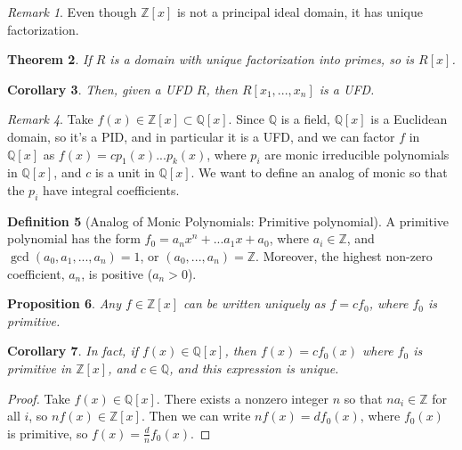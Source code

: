 \documentclass[12pt]{article}
\newtheorem{thm}{Theorem}[section]
\newtheorem{cor}[thm]{Corollary}
\newtheorem{prop}[thm]{Proposition}
\theoremstyle{definition}
\newtheorem{defn}[thm]{Definition}
\theoremstyle{remark}
\newtheorem{rmk}[thm]{Remark}
\numberwithin{equation}{section}
\newcommand\Z{\mathbb Z}    %
\newcommand\Q{\mathbb Q}    %
\begin{document}
\begin{rmk}
        Even though $\Z[x]$ is not a principal ideal domain, it has unique factorization.
\end{rmk}

\vspace{15pt}

\begin{thm}
        If $R$ is a domain with unique factorization into primes, so is $R[x]$.
\end{thm}

\vspace{15pt}

\begin{cor}
        Then, given a UFD $R$, then $R[x_1,...,x_n]$ is a UFD.
\end{cor}

\vspace{15pt}

\begin{rmk}
        Take $f(x) \in \Z[x] \subset \Q[x]$. Since $\Q$ is a field, $\Q[x]$ is a Euclidean domain, so it's a PID, and in particular it is a UFD, and we can factor $f$ in $\Q[x]$ as $f(x) = cp_1(x)...p_k(x)$, where $p_i$ are monic irreducible polynomials in $\Q[x]$, and $c$ is a unit in $\Q[x]$. We want to define an analog of monic so that the $p_i$ have integral coefficients.
\end{rmk}

\vspace{15pt}

\begin{defn}[Analog of Monic Polynomials: Primitive polynomial]
        A primitive polynomial has the form $f_0 = a_nx^n + ... a_1x + a_0$, where $a_i \in \Z$, and $\gcd(a_0,a_1,...,a_n) = 1$, or $(a_0,...,a_n) = \Z$. Moreover, the highest non-zero coefficient, $a_n$, is positive ($a_n > 0$).
\end{defn}

\vspace{15pt}

\begin{prop}
        Any $f \in \Z[x]$ can be written uniquely as $f = cf_0$, where $f_0$ is primitive.
\end{prop}


\vspace{15pt}

\begin{cor}
        In fact, if $f(x) \in \Q[x]$, then $f(x) = cf_0(x)$ where $f_0$ is primitive in $\Z[x]$, and $c \in \Q$, and this expression is unique.
\end{cor}
\begin{proof}
        Take $f(x) \in \Q[x]$. There exists a nonzero integer $n$ so that $na_i \in \Z$ for all $i$, so $nf(x) \in \Z[x]$. Then we can write $nf(x) = df_0(x)$, where $f_0(x)$ is primitive, so $f(x) = \frac{d}{n}f_0(x)$. 
\end{proof}
\end{document}
